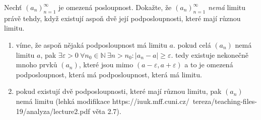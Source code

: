 Nechť $(a_n)_{n=1}^{\infty}$ je omezená posloupnost.
Dokažte, že $(a_n)_{n=1}^{\infty}$ \emph{nemá} limitu právě tehdy, když existují aspoň dvě její podposloupnosti, které mají různou limitu.

\begin{enumerate}

	\item  víme, že aspoň nějaká podposloupnost má limitu $a$.
		pokud celá $(a_n)$ nemá limitu $a$, pak $\exists \varepsilon > 0 \  \forall n_0 \in \mathbb{N} \  \exists n > n_0 \colon |a_n - a| \geq \varepsilon$.
		tedy existuje nekonečně mnoho prvků $(a_n)$, které jsou mimo $(a - \varepsilon, a + \varepsilon)$ a to je omezená podposloupnost, která má podposloupnost, která má limitu.

	\item  pokud existují dvě podposloupnosti, které mají různou limitu, pak $(a_n)$ nemá limitu (lehká modifikace https://iuuk.mff.cuni.cz/~tereza/teaching-files-19/analyza/lecture2.pdf věta 2.7).

\end{enumerate}

